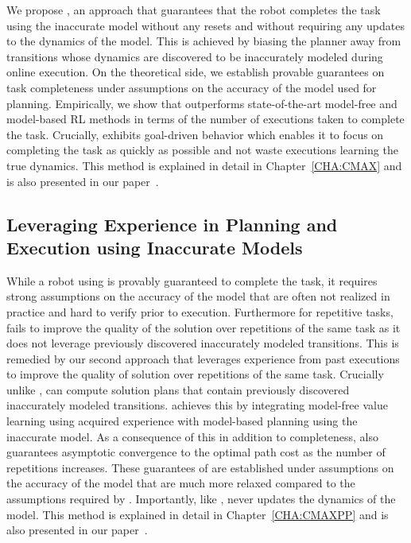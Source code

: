   We propose \cmax{}, an approach that guarantees that the robot
  completes the task using the inaccurate model without any resets and
  without requiring any updates to the dynamics of the model. This is
  achieved by biasing the planner away from transitions whose dynamics
  are discovered to be inaccurately modeled during online
  execution. On the theoretical side, we establish provable guarantees
  on task completeness under assumptions on the accuracy of the model
  used for planning. Empirically, we show that \cmax{} outperforms
  state-of-the-art model-free and model-based RL methods in terms of
  the number of executions taken to complete the task. Crucially,
  \cmax{} exhibits goal-driven behavior which enables it to focus on
  completing the task as quickly as possible and not waste executions  
  learning the true dynamics. This method is explained in detail in
  Chapter~\ref{CHA:CMAX} and is also presented in our
  paper~\cite{cmax}.

\subsection{Leveraging Experience in Planning and Execution using
  Inaccurate Models}
\label{sec:lever-exper-plann}
  
While a robot using \cmax{} is provably guaranteed to complete
  the task, it requires strong assumptions on the accuracy of the
  model that are often not realized in practice and hard to verify
  prior to execution. Furthermore for repetitive tasks, \cmax{} fails
  to improve the quality of the solution over repetitions of the same
  task as it does not leverage previously discovered inaccurately
  modeled transitions. This is remedied by our second approach
  \cmaxpp{} that leverages experience from past executions to improve
  the quality of solution over repetitions of the same
  task. Crucially unlike \cmax{}, \cmaxpp{} can compute solution
  plans that contain previously discovered inaccurately modeled
  transitions. \cmaxpp{} achieves this by integrating model-free value
  learning using acquired experience with model-based planning using
  the inaccurate model. As a consequence of this in addition to
  completeness, \cmaxpp{} also guarantees asymptotic convergence to
  the optimal path cost as the number of repetitions increases. These
  guarantees of \cmaxpp{} are established under assumptions on the
  accuracy of the model that are much more relaxed compared to the
  assumptions required by \cmax{}. Importantly, like \cmax{},
  \cmaxpp{} never updates the dynamics of the model. This method is
  explained in detail in Chapter~\ref{CHA:CMAXPP} and is also
  presented in our paper~\cite{cmaxpp}.

